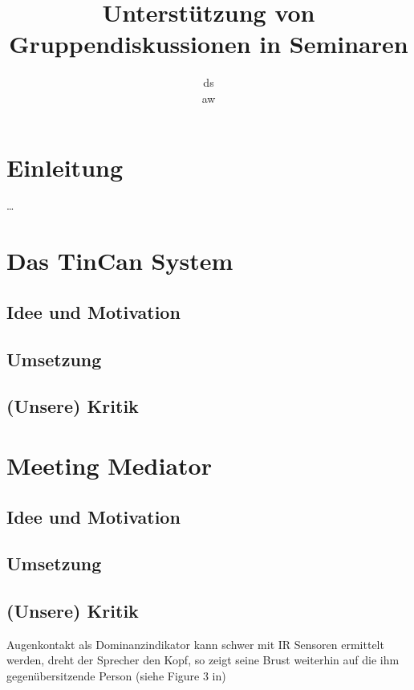 \documentclass{seminarvorlage}
\begin{document}
\title{Unterstützung von Gruppendiskussionen in Seminaren}
\author{
  \alignauthor ds\\
  \alignauthor aw\\
}

\maketitle


\section{Einleitung}
\ldots
\section{Das TinCan System}
\subsection{Idee und Motivation}

\subsection{Umsetzung}
\subsection{(Unsere) Kritik}

\section{Meeting Mediator}
\subsection{Idee und Motivation}
\subsection{Umsetzung}
\subsection{(Unsere) Kritik}
Augenkontakt als Dominanzindikator kann schwer mit IR Sensoren ermittelt werden,
dreht der Sprecher den Kopf, so zeigt seine Brust weiterhin auf die ihm 
gegenübersitzende Person (siehe Figure 3 in)
\end{document}

